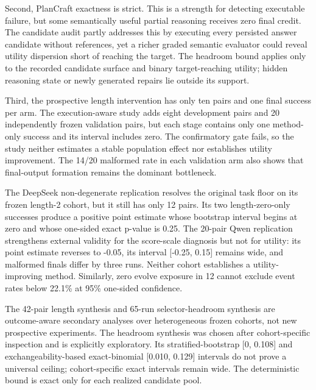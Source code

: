 \documentclass{article}
\begin{document}
Second, PlanCraft exactness is strict. This is a strength for detecting executable failure, but some semantically useful partial reasoning receives zero final credit. The candidate audit partly addresses this by executing every persisted answer candidate without references, yet a richer graded semantic evaluator could reveal utility dispersion short of reaching the target. The headroom bound applies only to the recorded candidate surface and binary target-reaching utility; hidden reasoning state or newly generated repairs lie outside its support.

Third, the prospective length intervention has only ten pairs and one final success per arm. The execution-aware study adds eight development pairs and 20 independently frozen validation pairs, but each stage contains only one method-only success and its interval includes zero. The confirmatory gate fails, so the study neither estimates a stable population effect nor establishes utility improvement. The 14/20 malformed rate in each validation arm also shows that final-output formation remains the dominant bottleneck.

The DeepSeek non-degenerate replication resolves the original task floor on its frozen length-2 cohort, but it still has only 12 pairs. Its two length-zero-only successes produce a positive point estimate whose bootstrap interval begins at zero and whose one-sided exact p-value is 0.25. The 20-pair Qwen replication strengthens external validity for the score-scale diagnosis but not for utility: its point estimate reverses to -0.05, its interval [-0.25, 0.15] remains wide, and malformed finals differ by three runs. Neither cohort establishes a utility-improving method. Similarly, zero evolve exposure in 12 cannot exclude event rates below 22.1\% at 95\% one-sided confidence.

The 42-pair length synthesis and 65-run selector-headroom synthesis are outcome-aware secondary analyses over heterogeneous frozen cohorts, not new prospective experiments. The headroom synthesis was chosen after cohort-specific inspection and is explicitly exploratory. Its stratified-bootstrap [0, 0.108] and exchangeability-based exact-binomial [0.010, 0.129] intervals do not prove a universal ceiling; cohort-specific exact intervals remain wide. The deterministic bound is exact only for each realized candidate pool.
\end{document}

